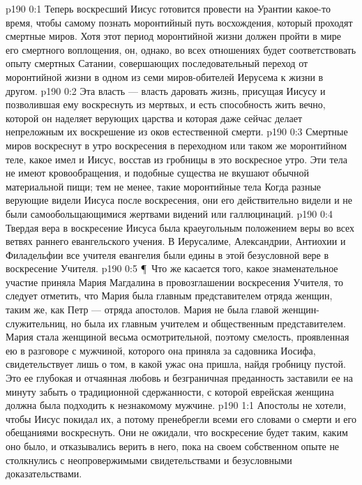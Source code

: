 \author{Комиссия срединников}
\vs p190 0:1 Теперь воскресший Иисус готовится провести на Урантии какое\hyp{}то время, чтобы самому познать моронтийный путь восхождения, который проходят смертные миров. Хотя этот период моронтийной жизни должен пройти в мире его смертного воплощения, он, однако, во всех отношениях будет соответствовать опыту смертных Сатании, совершающих последовательный переход от моронтийной жизни в одном из семи миров\hyp{}обителей Иерусема к жизни в другом.
\vs p190 0:2 Эта власть --- власть даровать жизнь, присущая Иисусу и позволившая ему воскреснуть из мертвых, и есть способность жить вечно, которой он наделяет верующих царства и которая даже сейчас делает непреложным их воскрешение из оков естественной смерти.
\vs p190 0:3 Смертные миров воскреснут в утро воскресения в переходном или таком же моронтийном теле, какое имел и Иисус, восстав из гробницы в это воскресное утро. Эти тела не имеют кровообращения, и подобные существа не вкушают обычной материальной пищи; тем не менее, такие моронтийные тела  Когда разные верующие видели Иисуса после воскресения, они его действительно видели и не были самообольщающимися жертвами видений или галлюцинаций.
\vs p190 0:4 Твердая вера в воскресение Иисуса была краеугольным положением веры во всех ветвях раннего евангельского учения. В Иерусалиме, Александрии, Антиохии и Филадельфии все учителя евангелия были едины в этой безусловной вере в воскресение Учителя.
\vs p190 0:5 \P\ Что же касается того, какое знаменательное участие приняла Мария Магдалина в провозглашении воскресения Учителя, то следует отметить, что Мария была главным представителем отряда женщин, таким же, как Петр --- отряда апостолов. Мария не была главой женщин\hyp{}служительниц, но была их главным учителем и общественным представителем. Мария стала женщиной весьма осмотрительной, поэтому смелость, проявленная ею в разговоре с мужчиной, которого она приняла за садовника Иосифа, свидетельствует лишь о том, в какой ужас она пришла, найдя гробницу пустой. Это ее глубокая и отчаянная любовь и безграничная преданность заставили ее на минуту забыть о традиционной сдержанности, с которой еврейская женщина должна была подходить к незнакомому мужчине.
\vs p190 1:1 Апостолы не хотели, чтобы Иисус покидал их, а потому пренебрегли всеми его словами о смерти и его обещаниями воскреснуть. Они не ожидали, что воскресение будет таким, каким оно было, и отказывались верить в него, пока на своем собственном опыте не столкнулись с неопровержимыми свидетельствами и безусловными доказательствами.
